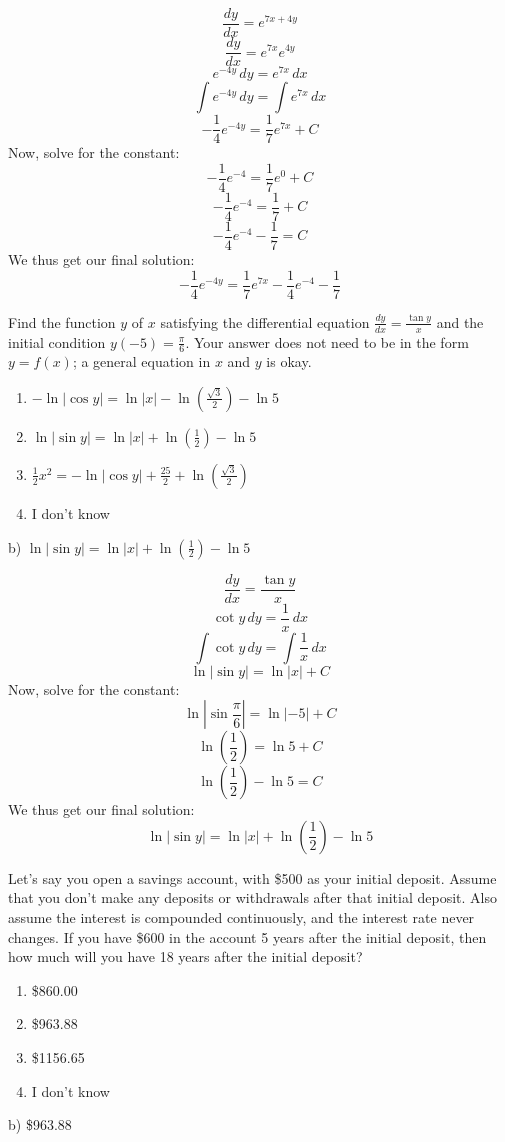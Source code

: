 \documentclass[addpoints,12pt,answers]{exam}
\begin{document}
\begin{questions}
\begin{solution}
    $$\frac{dy}{dx}=e^{7x+4y}$$
    $$\frac{dy}{dx}=e^{7x}e^{4y}$$
    $$e^{-4y}\,dy=e^{7x}\,dx$$
    $$\int e^{-4y}\,dy=\int e^{7x}\,dx$$
    $$-\frac{1}{4}e^{-4y}=\frac{1}{7}e^{7x}+C$$
    Now, solve for the constant: 
    $$-\frac{1}{4}e^{-4}=\frac{1}{7}e^0+C$$
    $$-\frac{1}{4}e^{-4}=\frac{1}{7}+C$$
    $$-\frac{1}{4}e^{-4}-\frac{1}{7}=C$$
    We thus get our final solution:
    $$-\frac{1}{4}e^{-4y}=\frac{1}{7}e^{7x}-\frac{1}{4}e^{-4}-\frac{1}{7}$$
  \end{solution}
  \newpage
  \question
  Find the function $y$ of $x$ satisfying the differential equation $\displaystyle\frac{dy}{dx}=\frac{\tan y}{x}$ and the initial condition $\displaystyle y(-5)=\frac{\pi}{6}$. Your answer does not need to be in the form $y=f(x)$; a general equation in $x$ and $y$ is okay.
  \begin{enumerate}[label=\alph*)]
    \item
    $\displaystyle -\ln|\cos y|=\ln|x|-\ln\left(\frac{\sqrt{3}}{2}\right)-\ln 5$
    \item
    $\displaystyle\ln|\sin y|=\ln|x|+\ln\left(\frac{1}{2}\right)-\ln 5$
    \item
    $\displaystyle\frac{1}{2}x^2=-\ln|\cos y|+\frac{25}{2}+\ln\left(\frac{\sqrt{3}}{2}\right)$
    \item
    I don't know
  \end{enumerate}
  \begin{solution}
    b) $\displaystyle\ln|\sin y|=\ln|x|+\ln\left(\frac{1}{2}\right)-\ln 5$
    
    $$\frac{dy}{dx}=\frac{\tan y}{x}$$
    $$\cot y\,dy=\frac{1}{x}\,dx$$
    $$\int\cot y\,dy=\int\frac{1}{x}\,dx$$
    $$\ln|\sin y|=\ln|x|+C$$
    Now, solve for the constant: 
    $$\ln\left|\sin\frac{\pi}{6}\right|=\ln|-5|+C$$
    $$\ln\left(\frac{1}{2}\right)=\ln 5+C$$
    $$\ln\left(\frac{1}{2}\right)-\ln 5=C$$
    We thus get our final solution:
    $$\ln|\sin y|=\ln|x|+\ln\left(\frac{1}{2}\right)-\ln 5$$
  \end{solution}
  \newpage
  \question
  Let's say you open a savings account, with \$500 as your initial deposit. Assume that you don't make any deposits or withdrawals after that initial deposit. Also assume the interest is compounded continuously, and the interest rate never changes. If you have \$600 in the account 5 years after the initial deposit, then how much will you have 18 years after the initial deposit?
  \begin{enumerate}[label=\alph*)]
    \item
    \$860.00
    \item
    \$963.88
    \item
    \$1156.65
    \item
    I don't know
  \end{enumerate}
  \begin{solution}
    b) \$963.88
    

\end{solution}
\end{questions}
\end{document}
